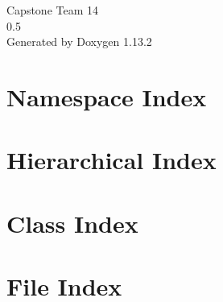\documentclass[twoside]{book}
\newcommand{\+}{\discretionary{\mbox{\scriptsize$\hookleftarrow$}}{}{}}
\newcommand{\clearemptydoublepage}{%
    \newpage{\pagestyle{empty}\cleardoublepage}%
  }
\begin{document}
  \raggedbottom
    \hypersetup{pageanchor=false,
                bookmarksnumbered=true,
                pdfencoding=unicode
               }
  \begin{titlepage}
  \vspace*{7cm}
  \begin{center}%
  {\Large Capstone Team 14}\\
  [1ex]\large 0.\+5 \\
  \vspace*{1cm}
  {\large Generated by Doxygen 1.13.2}\\
  \end{center}
  \end{titlepage}
  \clearemptydoublepage
  \tableofcontents
  \clearemptydoublepage
  \hypersetup{pageanchor=true}

\chapter{Namespace Index}

\chapter{Hierarchical Index}

\chapter{Class Index}

\chapter{File Index}

\end{document}
